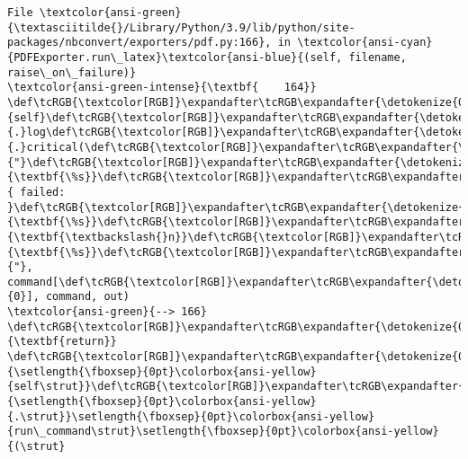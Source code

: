 \documentclass[11pt]{article}
\begin{document}
\begin{Verbatim}[commandchars=\\\{\}, frame=single, framerule=2mm, rulecolor=\color{outerrorbackground}]
File \textcolor{ansi-green}{\textasciitilde{}/Library/Python/3.9/lib/python/site-packages/nbconvert/exporters/pdf.py:166}, in \textcolor{ansi-cyan}{PDFExporter.run\_latex}\textcolor{ansi-blue}{(self, filename, raise\_on\_failure)}
\textcolor{ansi-green-intense}{\textbf{    164}}     \def\tcRGB{\textcolor[RGB]}\expandafter\tcRGB\expandafter{\detokenize{0,135,0}}{self}\def\tcRGB{\textcolor[RGB]}\expandafter\tcRGB\expandafter{\detokenize{98,98,98}}{.}log\def\tcRGB{\textcolor[RGB]}\expandafter\tcRGB\expandafter{\detokenize{98,98,98}}{.}critical(\def\tcRGB{\textcolor[RGB]}\expandafter\tcRGB\expandafter{\detokenize{175,0,0}}{"}\def\tcRGB{\textcolor[RGB]}\expandafter\tcRGB\expandafter{\detokenize{175,95,135}}{\textbf{\%s}}\def\tcRGB{\textcolor[RGB]}\expandafter\tcRGB\expandafter{\detokenize{175,0,0}}{ failed: }\def\tcRGB{\textcolor[RGB]}\expandafter\tcRGB\expandafter{\detokenize{175,95,135}}{\textbf{\%s}}\def\tcRGB{\textcolor[RGB]}\expandafter\tcRGB\expandafter{\detokenize{175,95,0}}{\textbf{\textbackslash{}n}}\def\tcRGB{\textcolor[RGB]}\expandafter\tcRGB\expandafter{\detokenize{175,95,135}}{\textbf{\%s}}\def\tcRGB{\textcolor[RGB]}\expandafter\tcRGB\expandafter{\detokenize{175,0,0}}{"}, command[\def\tcRGB{\textcolor[RGB]}\expandafter\tcRGB\expandafter{\detokenize{98,98,98}}{0}], command, out)
\textcolor{ansi-green}{--> 166} \def\tcRGB{\textcolor[RGB]}\expandafter\tcRGB\expandafter{\detokenize{0,135,0}}{\textbf{return}} \def\tcRGB{\textcolor[RGB]}\expandafter\tcRGB\expandafter{\detokenize{0,135,0}}{\setlength{\fboxsep}{0pt}\colorbox{ansi-yellow}{self\strut}}\def\tcRGB{\textcolor[RGB]}\expandafter\tcRGB\expandafter{\detokenize{98,98,98}}{\setlength{\fboxsep}{0pt}\colorbox{ansi-yellow}{.\strut}}\setlength{\fboxsep}{0pt}\colorbox{ansi-yellow}{run\_command\strut}\setlength{\fboxsep}{0pt}\colorbox{ansi-yellow}{(\strut}

\end{Verbatim}
\end{document}
